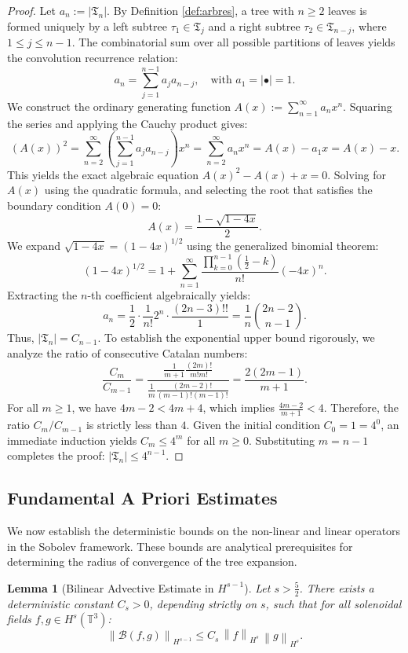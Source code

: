 \documentclass[12pt,a4paper]{article}
\theoremstyle{plain}
\newtheorem{lemma}[theorem]{Lemma}
\theoremstyle{definition}
\theoremstyle{remark}
\newcommand{\Hs}{H^s}
\newcommand{\T}{\mathbb{T}}
\newcommand{\norm}[1]{\left\|#1\right\|}
\newcommand{\BB}{\mathcal{B}}
\newcommand{\fT}{\mathfrak{T}}
\begin{document}
\begin{proof}
Let $a_n := |\fT_n|$. By Definition \ref{def:arbres}, a tree with $n \ge 2$ leaves is formed uniquely by a left subtree $\tau_1 \in \fT_j$ and a right subtree $\tau_2 \in \fT_{n-j}$, where $1 \le j \le n-1$. The combinatorial sum over all possible partitions of leaves yields the convolution recurrence relation:
\[
  a_n = \sum_{j=1}^{n-1} a_j a_{n-j}, \quad \text{with } a_1 = |\bullet| = 1.
\]
We construct the ordinary generating function $A(x) := \sum_{n=1}^\infty a_n x^n$. Squaring the series and applying the Cauchy product gives:
\[
  (A(x))^2 = \sum_{n=2}^\infty \left( \sum_{j=1}^{n-1} a_j a_{n-j} \right) x^n = \sum_{n=2}^\infty a_n x^n = A(x) - a_1 x = A(x) - x.
\]
This yields the exact algebraic equation $A(x)^2 - A(x) + x = 0$. Solving for $A(x)$ using the quadratic formula, and selecting the root that satisfies the boundary condition $A(0)=0$:
\[
  A(x) = \frac{1 - \sqrt{1 - 4x}}{2}.
\]
We expand $\sqrt{1-4x} = (1-4x)^{1/2}$ using the generalized binomial theorem:
\[
  (1-4x)^{1/2} = 1 + \sum_{n=1}^\infty \frac{\prod_{k=0}^{n-1} (\frac{1}{2} - k)}{n!} (-4x)^n.
\]
Extracting the $n$-th coefficient algebraically yields:
\[
  a_n = \frac{1}{2} \cdot \frac{1}{n!} 2^n \cdot \frac{(2n-3)!!}{1} = \frac{1}{n} \binom{2n-2}{n-1}.
\]
Thus, $|\fT_n| = C_{n-1}$. To establish the exponential upper bound rigorously, we analyze the ratio of consecutive Catalan numbers:
\[
  \frac{C_m}{C_{m-1}} = \frac{\frac{1}{m+1}\frac{(2m)!}{m!m!}}{\frac{1}{m}\frac{(2m-2)!}{(m-1)!(m-1)!}} = \frac{2(2m-1)}{m+1}.
\]
For all $m \ge 1$, we have $4m - 2 < 4m + 4$, which implies $\frac{4m-2}{m+1} < 4$. Therefore, the ratio $C_m / C_{m-1}$ is strictly less than $4$. Given the initial condition $C_0 = 1 = 4^0$, an immediate induction yields $C_m \le 4^m$ for all $m \ge 0$. Substituting $m = n-1$ completes the proof: $|\fT_n| \le 4^{n-1}$.
\end{proof}


\subsection{Fundamental A Priori Estimates}
\label{subsec:apriori_estimates}

We now establish the deterministic bounds on the non-linear and linear operators in the Sobolev framework. These bounds are analytical prerequisites for determining the radius of convergence of the tree expansion.

\begin{lemma}[Bilinear Advective Estimate in $H^{s-1}$]
\label{lem:bilin}
Let $s > \frac{5}{2}$. There exists a deterministic constant $C_s > 0$, depending strictly on $s$, such that for all solenoidal fields $f,g\in\Hs(\T^3)$:
\[
  \norm{\BB(f,g)}_{H^{s-1}} \le C_s\,\norm{f}_{H^s}\,\norm{g}_{H^s}.
\]
\end{lemma}
\end{document}
